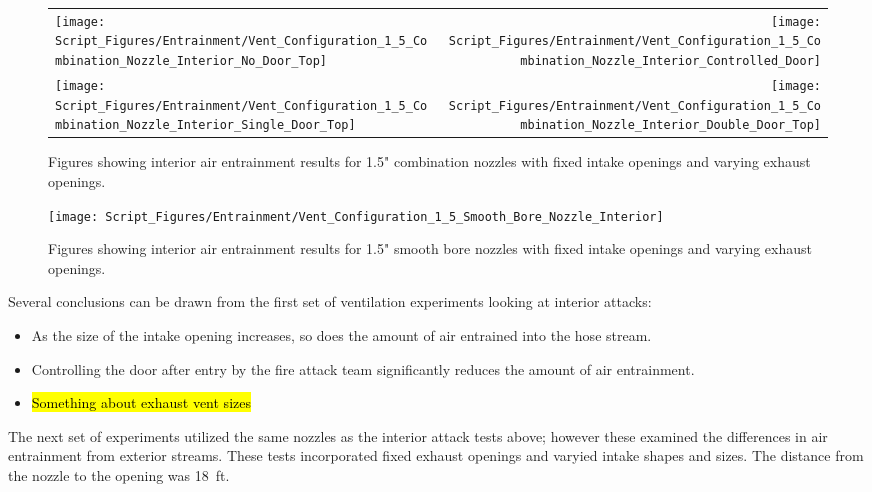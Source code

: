 \documentclass[12pt,oneside]{book}
\begin{document}
\begin{figure}[!ht]
\begin{tabular*}{\textwidth}{lr}
\texttt{[image: Script\_Figures/Entrainment/Vent\_Configuration\_1\_5\_Combination\_Nozzle\_Interior\_No\_Door\_Top]} &
\texttt{[image: Script\_Figures/Entrainment/Vent\_Configuration\_1\_5\_Combination\_Nozzle\_Interior\_Controlled\_Door]} \\
\texttt{[image: Script\_Figures/Entrainment/Vent\_Configuration\_1\_5\_Combination\_Nozzle\_Interior\_Single\_Door\_Top]} &
\texttt{[image: Script\_Figures/Entrainment/Vent\_Configuration\_1\_5\_Combination\_Nozzle\_Interior\_Double\_Door\_Top]} \\
\end{tabular*}
\caption{Figures showing interior air entrainment results for 1.5" combination nozzles with fixed intake openings and varying exhaust openings.}
\label{fig:1_5_Interior_Combination_Vents}
\end{figure}

\clearpage

\begin{figure}[!ht]
\centering
\texttt{[image: Script\_Figures/Entrainment/Vent\_Configuration\_1\_5\_Smooth\_Bore\_Nozzle\_Interior]}
\caption{Figures showing interior air entrainment results for 1.5" smooth bore nozzles with fixed intake openings and varying exhaust openings.}
\label{fig:1_5_Interior_Smooth_Bore_Vents}
\end{figure}

Several conclusions can be drawn from the first set of ventilation experiments looking at interior attacks:

\begin{itemize}
	\item As the size of the intake opening increases, so does the amount of air entrained into the hose stream.
	\item Controlling the door after entry by the fire attack team significantly reduces the amount of air entrainment.
	\item \hl{Something about exhaust vent sizes}
\end{itemize}

\clearpage

The next set of experiments utilized the same nozzles as the interior attack tests above; however these examined the differences in air entrainment from exterior streams. These tests incorporated fixed exhaust openings and varyied intake shapes and sizes. The distance from the nozzle to the opening was 18~ft.
\end{document}
